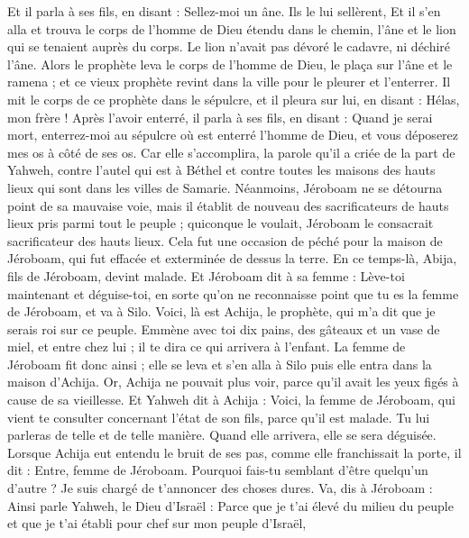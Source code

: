 \begin{multicols}{2}
Et il parla à ses fils, en disant : Sellez-moi un âne. Ils le lui sellèrent,
Et il s'en alla et trouva le corps de l'homme de Dieu étendu dans le chemin, l'âne et le lion qui se tenaient auprès du corps. Le lion n'avait pas dévoré le cadavre, ni déchiré l'âne.
Alors le prophète leva le corps de l'homme de Dieu, le plaça sur l'âne et le ramena ; et ce vieux prophète revint dans la ville pour le pleurer et l'enterrer.
Il mit le corps de ce prophète dans le sépulcre, et il pleura sur lui, en disant : Hélas, mon frère !
Après l’avoir enterré, il parla à ses fils, en disant : Quand je serai mort, enterrez-moi au sépulcre où est enterré l'homme de Dieu, et vous déposerez mes os à côté de ses os.
Car elle s’accomplira, la parole qu’il a criée de la part de Yahweh, contre l'autel qui est à Béthel et contre toutes les maisons des hauts lieux qui sont dans les villes de Samarie.
Néanmoins, Jéroboam ne se détourna point de sa mauvaise voie, mais il établit de nouveau des sacrificateurs de hauts lieux pris parmi tout le peuple ; quiconque le voulait, Jéroboam le consacrait sacrificateur des hauts lieux.
Cela fut une occasion de péché pour la maison de Jéroboam, qui fut effacée et exterminée de dessus la terre.
\VerseOne{}En ce temps-là, Abija, fils de Jéroboam, devint malade.
Et Jéroboam dit à sa femme : Lève-toi maintenant et déguise-toi, en sorte qu'on ne reconnaisse point que tu es la femme de Jéroboam, et va à Silo. Voici, là est Achija, le prophète, qui m'a dit que je serais roi sur ce peuple.
Emmène avec toi dix pains, des gâteaux et un vase de miel, et entre chez lui ; il te dira ce qui arrivera à l’enfant.
La femme de Jéroboam fit donc ainsi ; elle se leva et s'en alla à Silo puis elle entra dans la maison d'Achija. Or, Achija ne pouvait plus voir, parce qu’il avait les yeux figés à cause de sa vieillesse.
Et Yahweh dit à Achija : Voici, la femme de Jéroboam, qui vient te consulter concernant l’état de son fils, parce qu'il est malade. Tu lui parleras de telle et de telle manière. Quand elle arrivera, elle se sera déguisée.
Lorsque Achija eut entendu le bruit de ses pas, comme elle franchissait la porte, il dit : Entre, femme de Jéroboam. Pourquoi fais-tu semblant d'être quelqu’un d’autre ? Je suis chargé de t’annoncer des choses dures.
Va, dis à Jéroboam : Ainsi parle Yahweh, le Dieu d'Israël : Parce que je t'ai élevé du milieu du peuple et que je t'ai établi pour chef sur mon peuple d'Israël,

\end{multicols}

